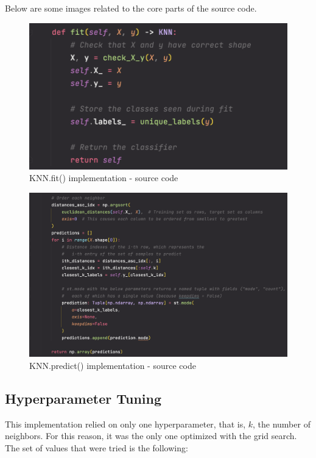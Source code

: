 Below are some images related to the core parts of the source code.

\begin{figure}[h]
    \centering
    \includegraphics[scale=0.6]{images/exp-results/knn/knn-fit.png}
    \caption{KNN.fit() implementation - source code}
    \label{fig:exp_res_knn_fit}
\end{figure}

\begin{figure}[h]
    \centering
    \includegraphics[scale=0.4]{images/exp-results/knn/knn-predict.png}
    \caption{KNN.predict() implementation - source code}
    \label{fig:exp_res_knn_predict}
\end{figure}

\subsection{Hyperparameter Tuning}

This implementation relied on only one hyperparameter, that is, $k$, the number of neighbors. For this reason, it was the only one optimized with the grid search. The set of values that were tried is the following:

